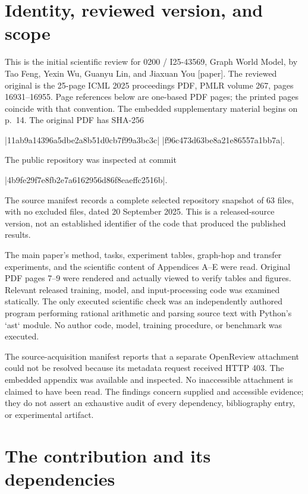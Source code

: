 \documentclass[10pt]{article}
\begin{document}
\section*{Identity, reviewed version, and scope}
This is the initial scientific review for 0200 / I25-43569, Graph World Model, by Tao Feng, Yexin Wu, Guanyu Lin, and Jiaxuan You [paper]. The reviewed original is the 25-page ICML 2025 proceedings PDF, PMLR volume 267, pages 16931–16955. Page references below are one-based PDF pages; the printed pages coincide with that convention. The embedded supplementary material begins on p. 14. The original PDF has SHA-256\par
|11ab9a14396a5dbe2a8b51d0cb7f99a3bc3c|
|f96c473d63be8a21e86557a1bb7a|.\par
The public repository was inspected at commit\par
|4b9fe29f7e8fb2e7a6162956d86f8eaeffc2516b|.\par
The source manifest records a complete selected repository snapshot of 63 files, with no excluded files, dated 20 September 2025. This is a released-source version, not an established identifier of the code that produced the published results.\par
The main paper’s method, tasks, experiment tables, graph-hop and transfer experiments, and the scientific content of Appendices A–E were read. Original PDF pages 7–9 were rendered and actually viewed to verify tables and figures. Relevant released training, model, and input-processing code was examined statically. The only executed scientific check was an independently authored program performing rational arithmetic and parsing source text with Python’s `ast` module. No author code, model, training procedure, or benchmark was executed.\par
The source-acquisition manifest reports that a separate OpenReview attachment could not be resolved because its metadata request received HTTP 403. The embedded appendix was available and inspected. No inaccessible attachment is claimed to have been read. The findings concern supplied and accessible evidence; they do not assert an exhaustive audit of every dependency, bibliography entry, or experimental artifact.\par
\section*{The contribution and its dependencies}
\end{document}
